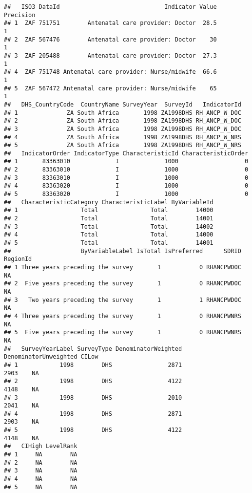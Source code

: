 \documentclass[
]{article}
\begin{document}
\begin{verbatim}
##   ISO3 DataId                              Indicator Value Precision
## 1  ZAF 751751        Antenatal care provider: Doctor  28.5         1
## 2  ZAF 567476        Antenatal care provider: Doctor    30         1
## 3  ZAF 205488        Antenatal care provider: Doctor  27.3         1
## 4  ZAF 751748 Antenatal care provider: Nurse/midwife  66.6         1
## 5  ZAF 567472 Antenatal care provider: Nurse/midwife    65         1
##   DHS_CountryCode  CountryName SurveyYear  SurveyId   IndicatorId
## 1              ZA South Africa       1998 ZA1998DHS RH_ANCP_W_DOC
## 2              ZA South Africa       1998 ZA1998DHS RH_ANCP_W_DOC
## 3              ZA South Africa       1998 ZA1998DHS RH_ANCP_W_DOC
## 4              ZA South Africa       1998 ZA1998DHS RH_ANCP_W_NRS
## 5              ZA South Africa       1998 ZA1998DHS RH_ANCP_W_NRS
##   IndicatorOrder IndicatorType CharacteristicId CharacteristicOrder
## 1       83363010             I             1000                   0
## 2       83363010             I             1000                   0
## 3       83363010             I             1000                   0
## 4       83363020             I             1000                   0
## 5       83363020             I             1000                   0
##   CharacteristicCategory CharacteristicLabel ByVariableId
## 1                  Total               Total        14000
## 2                  Total               Total        14001
## 3                  Total               Total        14002
## 4                  Total               Total        14000
## 5                  Total               Total        14001
##                    ByVariableLabel IsTotal IsPreferred      SDRID RegionId
## 1 Three years preceding the survey       1           0 RHANCPWDOC       NA
## 2  Five years preceding the survey       1           0 RHANCPWDOC       NA
## 3   Two years preceding the survey       1           1 RHANCPWDOC       NA
## 4 Three years preceding the survey       1           0 RHANCPWNRS       NA
## 5  Five years preceding the survey       1           0 RHANCPWNRS       NA
##   SurveyYearLabel SurveyType DenominatorWeighted DenominatorUnweighted CILow
## 1            1998        DHS                2871                  2903    NA
## 2            1998        DHS                4122                  4148    NA
## 3            1998        DHS                2010                  2041    NA
## 4            1998        DHS                2871                  2903    NA
## 5            1998        DHS                4122                  4148    NA
##   CIHigh LevelRank
## 1     NA        NA
## 2     NA        NA
## 3     NA        NA
## 4     NA        NA
## 5     NA        NA
\end{verbatim}
\end{document}
